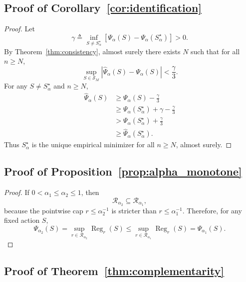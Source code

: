 \documentclass{article}
\newcommand{\cR}{\mathcal{R}}
\newcommand{\cS}{\mathcal{S}}
\newcommand{\bracks}[1]{\left[ #1 \right]}
\newcommand{\1}{\mathbbm{1}}
\begin{document}
\subsection{Proof of Corollary~\ref{cor:identification}}

\begin{proof}
Let
\[
    \gamma
    \triangleq
    \inf_{S\neq S_\alpha^\star}
    \bracks{
        \Psi_\alpha(S)-\Psi_\alpha(S_\alpha^\star)
    }
    > 0.
\]
By Theorem~\ref{thm:consistency}, almost surely there exists \(N\) such that for all \(n\ge N\),
\[
    \sup_{S\in\cS_M}
    \left|
        \widehat{\Psi}_\alpha(S)-\Psi_\alpha(S)
    \right|
    < \frac{\gamma}{3}.
\]
For any \(S\neq S_\alpha^\star\) and \(n\ge N\),
\begin{align*}
    \widehat{\Psi}_\alpha(S)
    &\ge
    \Psi_\alpha(S) - \frac{\gamma}{3}
    \\
    &\ge
    \Psi_\alpha(S_\alpha^\star) + \gamma - \frac{\gamma}{3}
    \\
    &>
    \Psi_\alpha(S_\alpha^\star) + \frac{\gamma}{3}
    \\
    &\ge
    \widehat{\Psi}_\alpha(S_\alpha^\star).
\end{align*}
Thus \(S_\alpha^\star\) is the unique empirical minimizer for all \(n\ge N\), almost surely.
\end{proof}

\subsection{Proof of Proposition~\ref{prop:alpha_monotone}}

\begin{proof}
If \(0 < \alpha_1 \le \alpha_2 \le 1\), then
\[
    \cR_{\alpha_2} \subseteq \cR_{\alpha_1},
\]
because the pointwise cap \(r\le \alpha_2^{-1}\) is stricter than \(r\le \alpha_1^{-1}\). Therefore, for any fixed action \(S\),
\[
    \Psi_{\alpha_2}(S)
    =
    \sup_{r\in\cR_{\alpha_2}} \operatorname{Reg}_r(S)
    \le
    \sup_{r\in\cR_{\alpha_1}} \operatorname{Reg}_r(S)
    =
    \Psi_{\alpha_1}(S).
\]
\end{proof}

\subsection{Proof of Theorem~\ref{thm:complementarity}}
\end{document}
